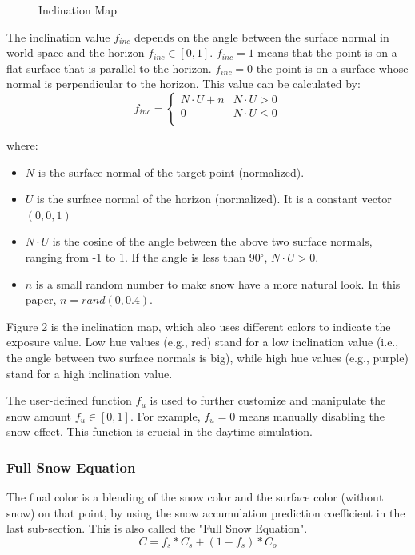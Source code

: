 \documentclass{article}
\begin{document}
\begin{figure}[h]
\begin{minipage}{0.4\textwidth}
      \caption{Inclination Map}
      \label{fig:InclinationMap}
  \end{minipage}
\end{figure}

The inclination value \( f_{inc} \) depends on the angle between the surface normal in world space and the horizon 
\( f_{inc} \in [0, 1] \). \( f_{inc}=1 \) means that the point is on a flat surface that is parallel to the horizon. 
\( f_{inc}=0 \) the point is on a surface whose normal is perpendicular to the horizon. This value can be calculated by:
\[
  f_{inc}=
  \left\{
    \begin{array}{ll}
      N \cdot U + n & N \cdot U > 0 \\
      0 & N \cdot U \leq 0 \\
    \end{array} 
  \right. 
\]

where:
\begin{itemize}
  \item \( N \) is the surface normal of the target point (normalized).
  \item \( U \) is the surface normal of the horizon (normalized). It is a constant vector \((0, 0, 1)\)
  \item \( N \cdot U \) is the cosine of the angle between the above two surface normals, ranging from -1 to 1. If the angle is less 
  than 90$^{\circ}$, \( N \cdot U > 0\).
  \item \( n \) is a small random number to make snow have a more natural look. In this paper, \(n = rand(0, 0.4)\).
\end{itemize}

Figure 2 is the inclination map, which also uses different colors to indicate the exposure value. Low hue values (e.g., red) stand for 
a low inclination value (i.e., the angle between two surface normals is big), while high hue values (e.g., purple) stand for a high 
inclination value.

The user-defined function \( f_{u} \) is used to further customize and manipulate the snow amount \( f_{u} \in [0, 1] \). For example, 
\( f_{u}=0 \) means manually disabling the snow effect. This function is crucial in the daytime simulation.

\subsubsection {Full Snow Equation}
The final color is a blending of the snow color and the surface color (without snow) on that point, by using the snow accumulation 
prediction coefficient in the last sub-section. This is also called the "Full Snow Equation".
\[
  C = f_{s} * C_{s} + (1-f_{s}) * C_{o}
\]
\end{document}
